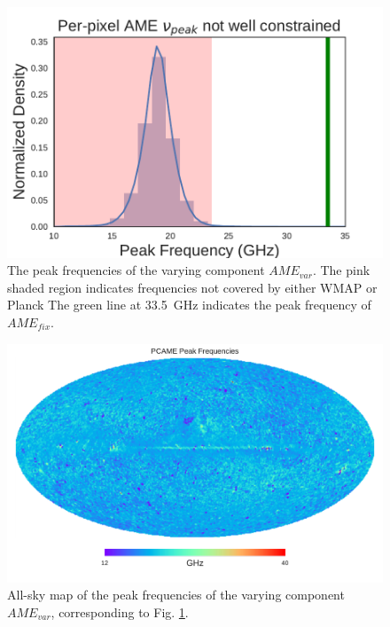         \begin{figure}
          \label{fig:AME_commander_freqdist}
          \includegraphics[width=\textwidth]{../Plots/ch_intro/AME_commander_freqdist.pdf}
          \centering
          \caption{The peak frequencies of the varying component $AME_{var}$.  The pink shaded region indicates frequencies not covered by either WMAP or Planck The green line at 33.5~GHz indicates the peak frequency of $AME_{fix}$.}
        \end{figure}

        \begin{figure}
          \label{fig:PCAME_var_freq.pdf}
          \includegraphics[width=\textwidth]{../Plots/ch_datasources/PCAME_var_freq.pdf}
          \centering
          \caption{All-sky map of the peak frequencies of the varying component $AME_{var}$, corresponding to Fig. \ref{fig:AME_commander_freqdist}.}
        \end{figure}

